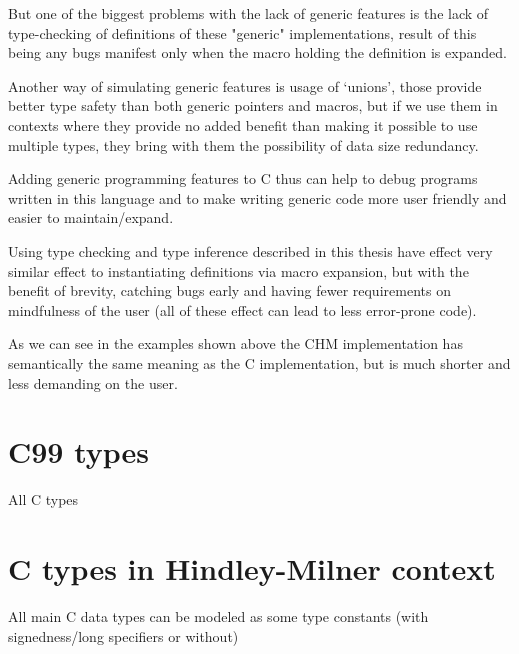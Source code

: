 But one of the biggest problems with the lack of generic features is the lack of type-checking
of definitions of these "generic" implementations, result of this being any bugs manifest only
when the macro holding the definition is expanded.

Another way of simulating generic features is usage of `unions', those provide better type safety
than both generic pointers and macros, but if we use them in contexts where they provide no added benefit
than making it possible to use multiple types, they bring with them the possibility of data size redundancy.

Adding generic programming features to C thus can help to debug programs written in this language and
to make writing generic code more user friendly and easier to maintain/expand. %


Using type checking and type inference described in this thesis have effect very similar effect to instantiating
definitions via macro expansion, but with the benefit of brevity, catching bugs early and having fewer
requirements on mindfulness of the user (all of these effect can lead to less error-prone code).


As we can see in the examples shown above the CHM implementation has semantically the same meaning as the C
implementation, but is much shorter and less demanding on the user.





\section{C99 types}


All C types

\section{C types in Hindley-Milner context}

All main C data types can be modeled as some type constants (with signedness/long specifiers or without)

